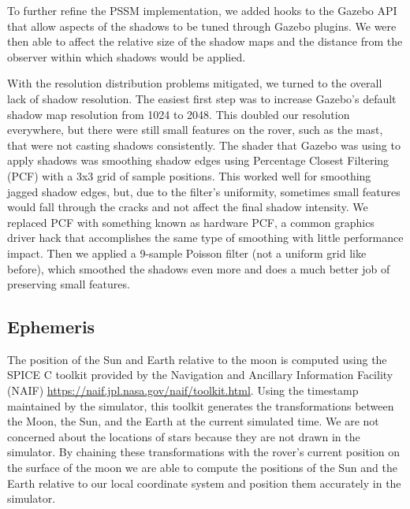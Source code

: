 \documentclass[twocolumn,letterpaper]{IEEEAerospaceCLS}  %
\begin{document}
To further refine the PSSM implementation, we added hooks to the Gazebo API that allow aspects of the shadows to be tuned through Gazebo plugins. 
We were then able to affect the relative size of the shadow maps and the distance from the observer within which shadows would be applied.

With the resolution distribution problems mitigated, we turned to the overall lack of shadow resolution. 
The easiest first step was to increase Gazebo's default shadow map resolution from 1024 to 2048. 
This doubled our resolution everywhere, but there were still small features on the rover, such as the mast, that were not casting shadows consistently. 
The shader that Gazebo was using to apply shadows was smoothing shadow edges using Percentage Closest Filtering (PCF) with a 3x3 grid of sample positions. 
This worked well for smoothing jagged shadow edges, but, due to the filter's uniformity, sometimes small features would fall through the cracks and not affect the final shadow intensity. 
We replaced PCF with something known as hardware PCF, a common graphics driver hack that accomplishes the same type of smoothing with little performance impact. 
Then we applied a 9-sample Poisson filter (not a uniform grid like before), which smoothed the shadows even more and does a much better job of preserving small features.

\subsection{Ephemeris}
The position of the Sun and Earth relative to the moon is computed using the SPICE C toolkit provided by the Navigation and Ancillary Information Facility (NAIF) \url{https://naif.jpl.nasa.gov/naif/toolkit.html}.  
Using the timestamp maintained by the simulator, this toolkit generates the transformations between the Moon, the Sun, and the Earth at the current simulated time.  
We are not concerned about the locations of stars because they are not drawn in the simulator.
By chaining these transformations with the rover's current position on the surface of the moon we are able to compute the positions of the Sun and the Earth relative to our local coordinate system and position them accurately in the simulator.  
\end{document}
